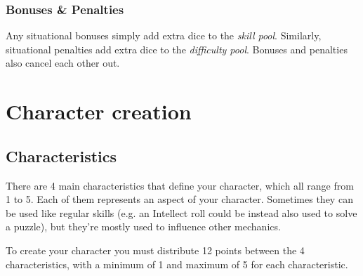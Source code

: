 \subsection{Bonuses \& Penalties}
Any situational bonuses simply add extra dice to the \textit{skill pool}. 
Similarly, situational penalties add extra dice to the \textit{difficulty pool}. 
Bonuses and penalties also cancel each other out. 


\chapter{Character creation}

\section{Characteristics} \label{characteristics}


There are 4 main characteristics that define your character, which all range from 1 to 5. 
Each of them represents an aspect of your character. Sometimes they can be used like regular skills (e.g. an Intellect roll could be  instead also used to solve a puzzle), 
but they're mostly used to influence other mechanics. 

To create your character you must distribute 12 points between the 4 characteristics, 
with a minimum of 1 and maximum of 5 for each characteristic.


